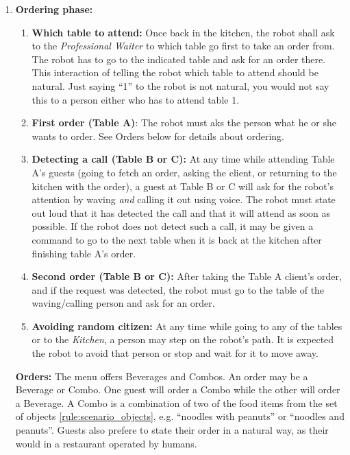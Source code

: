 \begin{enumerate}
	\item \textbf{Ordering phase:}
	\begin{enumerate}
		\item \textbf{Which table to attend:} Once back in the kitchen, the robot shall ask to the \textit{Professional Waiter} to which table go first to take an order from. 
		  The robot has to go to the indicated table and ask for an order there.
		  This interaction of telling the robot which table to attend should be natural. 
		  Just saying ``1'' to the robot is not natural, you would not say this to a person either who has to attend table 1.
		  
		\item \textbf{First order (Table A)}: The robot must aks the person what he or she wants to order. See Orders below for details about ordering.

		\item \textbf{Detecting a call (Table B or C):} At any time while attending Table A's guests (going to fetch an order, asking the client, or returning to the kitchen with the order), a guest at Table B or C will ask for the robot's attention by waving \emph{and} calling it out using voice. 
		  The robot must state out loud that it has detected the call and that it will attend as soon as possible.
		  If the robot does not detect such a call, it may be given a command to go to the next table when it is back at the kitchen after finishing table A's order.

		\item \textbf{Second order (Table B or C):} After taking the Table A client's order, and if the request was detected, the robot must go to the table of the waving/calling person and ask for an order.
		  

		\item \textbf{Avoiding random citizen:} At any time while going to any of the tables or to the \textit{Kitchen}, a person may step on the robot's path. It is expected the robot to avoid that person or stop and wait for it to move away.
	\end{enumerate}

	\textbf{Orders:} The menu offers Beverages and Combos. An order may be a Beverage or Combo. One guest will order a Combo while the other will order a Beverage.
	  A Combo is a combination of two of the food items from the set of objects \ref{rule:scenario_objects}, e.g. ``noodles with peanuts'' or ``noodles and peanuts''. 
	  Guests also prefere to state their order in a natural way, as their would in a restaurant operated by humans. 


\end{enumerate}

